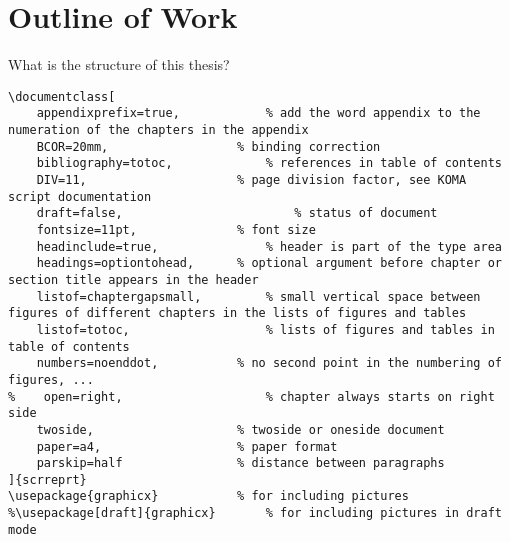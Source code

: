 \section{Outline of Work}
What is the structure of this thesis?
\lstset{language=java}
\begin{lstlisting}[caption={Code example for \LaTeX}]
\documentclass[
	appendixprefix=true,			% add the word appendix to the numeration of the chapters in the appendix
	BCOR=20mm,					% binding correction
	bibliography=totoc, 			% references in table of contents
    DIV=11,						% page division factor, see KOMA script documentation
    draft=false,						% status of document
    fontsize=11pt,				% font size
    headinclude=true,				% header is part of the type area
    headings=optiontohead,		% optional argument before chapter or section title appears in the header
    listof=chaptergapsmall,			% small vertical space between figures of different chapters in the lists of figures and tables
    listof=totoc,					% lists of figures and tables in table of contents
    numbers=noenddot,			% no second point in the numbering of figures, ...
%    open=right,					% chapter always starts on right side
    twoside,					% twoside or oneside document  
    paper=a4, 					% paper format
    parskip=half 				% distance between paragraphs
]{scrreprt}
\usepackage{graphicx}			% for including pictures
%\usepackage[draft]{graphicx}		% for including pictures in draft mode
\end{lstlisting}
